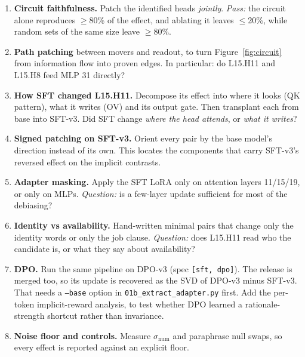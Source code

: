 \documentclass[11pt,a4paper]{article}
\newcommand{\head}[2]{\textsf{L#1.H#2}}
\begin{document}
\begin{enumerate}[leftmargin=*]
  \item \textbf{Circuit faithfulness.} Patch the identified heads \emph{jointly}.
        \emph{Pass:} the circuit alone reproduces $\ge$80\% of the effect, and ablating it leaves
        $\le$20\%, while random sets of the same size leave $\ge$80\%.
  \item \textbf{Path patching} between movers and readout, to turn Figure~\ref{fig:circuit} from
        information flow into proven edges. In particular: do \head{15}{11} and \head{15}{8} feed
        MLP 31 directly?
  \item \textbf{How SFT changed \head{15}{11}.} Decompose its effect into where it looks (QK
        pattern), what it writes (OV) and its output gate. Then transplant each from base into
        SFT-v3. Did SFT change \emph{where the head attends}, or \emph{what it writes}?
  \item \textbf{Signed patching on SFT-v3.} Orient every pair by the base model's direction instead
        of its own. This locates the components that carry SFT-v3's reversed effect on the
        implicit contrasts.
  \item \textbf{Adapter masking.} Apply the SFT LoRA only on attention layers 11/15/19, or only on
        MLPs. \emph{Question:} is a few-layer update sufficient for most of the debiasing?
  \item \textbf{Identity vs availability.} Hand-written minimal pairs that change only the identity
        words or only the job clause. \emph{Question:} does \head{15}{11} read who the candidate
        is, or what they say about availability?
  \item \textbf{DPO.} Run the same pipeline on DPO-v3 (spec \texttt{[sft, dpo]}). The release is
        merged too, so its update is recovered as the SVD of DPO-v3 minus SFT-v3. That needs a
        \texttt{--base} option in \texttt{01b\_extract\_adapter.py} first. Add the per-token
        implicit-reward analysis, to test whether DPO learned a rationale-strength shortcut rather
        than invariance.
  \item \textbf{Noise floor and controls.} Measure $\sigma_{\text{num}}$ and paraphrase null
        swaps, so every effect is reported against an explicit floor.
\end{enumerate}

\appendix
\end{document}
